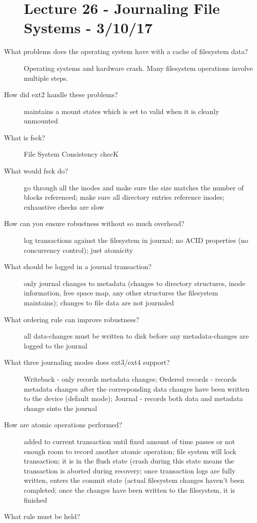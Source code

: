 \documentclass[10pt]{article}
\begin{document}
\begin{description}
\section{Lecture 26 - Journaling File Systems - 3/10/17}
\item[What problems does the operating system have with a cache of filesystem data?]
  Operating systems and hardware crash. Many filesystem operations involve multiple steps.
\item[How did ext2 handle these problems?]
  maintains a mount states which is set to valid when it is cleanly unmounted
\item[What is fsck?]
  File System Consistency checK
\item[What would fsck do?]
  go through all the inodes and make sure the size matches the number of blocks referenced;
  make sure all directory entries reference inodes;
  exhaustive checks are slow
\item[How can you ensure robustness without so much overhead?]
  log transactions against the filesystem in journal;
  no ACID properties (no concurrency control); just atomicity
\item[What should be logged in a journal transaction?]
  only journal changes to metadata (changes to directory structures, inode information, free space map, any other structures the filesystem maintains);
  changes to file data are not journaled
\item[What ordering rule can improve robustness?]
  all data-changes must be written to disk before any metadata-changes are logged to the journal
\item[What three journaling modes does ext3/ext4 support?]
  Writeback - only records metadata changes;
  Ordered records - records metadata changes after the corresponding data changes have been written to the device (default mode);
  Journal - records both data and metadata change sinto the journal
\item[How are atomic operations performed?]
  added to current transaction until fixed amount of time passes or not enough room to record another atomic operation;
  file system will lock transaction; it is in the flush state (crash during this state means the transaction is aborted during recovery;
  once transaction logs are fully written, enters the commit state (actual filesystem changes haven't been completed;
  once the changes have been written to the filesystem, it is finished
\item[What rule must be held?]

\end{description}
\end{document}
